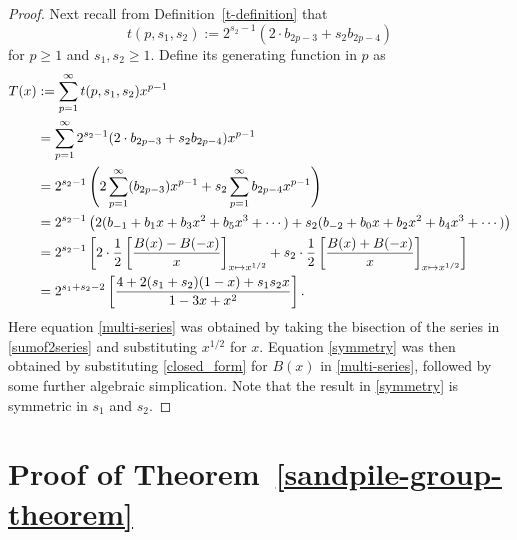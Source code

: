 \documentclass[10pt,reqno]{amsart}
\begin{document}
\begin{proof}
Next recall from Definition~\ref{t-definition} that  
\begin{equation*}
t(p,s_1,s_2):=2^{s_2-1}(2\cdot b_{2p-3} +s_2b_{2p-4})
\end{equation*} for $p \geq 1$ and $s_1,s_2\geq 1$. Define its generating function in $p$ as
\begin{align}
    T(x) &:= \displaystyle\sum_{p=1}^\infty t(p,s_1,s_2)x^{p-1}\notag\\
      &=\displaystyle\sum_{p=1}^\infty 2^{s_2-1}(2\cdot b_{2p-3} +s_2b_{2p-4})x^{p-1}\notag\\
       &=2^{s_2-1}\left(2\displaystyle\sum_{p=1}^\infty  (b_{2p-3} )x^{p-1} + s_2\displaystyle\sum_{p=1}^\infty b_{2p-4}x^{p-1}\right)\notag\\
       &=2^{s_2-1}\left(2(b_{-1} + b_1x + b_3x^2 +b_5x^3+\cdots) + s_2(b_{-2} + b_0x + b_2x^2 +b_4x^3+\cdots)\right)\label{sumof2series}\\
       &= 2^{s_2-1}\left[2\cdot\displaystyle\frac{1}{2}\left[\displaystyle\frac{B(x)-B(-x)}{x} \right]_{x \mapsto x^{1/2}} + s_2\cdot\displaystyle\frac{1}{2}
       \left[\displaystyle\frac{B(x)+B(-x)}{x}\right]_{x \mapsto x^{1/2}} \right] \label{multi-series} \\
       &= 2^{s_1+s_2-2}\left[\displaystyle\frac{4+2(s_1+s_2)(1-x)+s_1s_2x}{1-3x+x^2}\right].
       \label{symmetry}
\end{align}
Here equation \eqref{multi-series} was obtained  by taking the bisection of the series in \eqref{sumof2series} and substituting $x^{1/2}$ for $x.$ Equation \eqref{symmetry} was then obtained by substituting \eqref{closed_form} for $B(x)$ in \eqref{multi-series}, followed by  some further algebraic simplication.  Note that the result in \eqref{symmetry} is symmetric in $s_1$ and $s_2.$
\end{proof}





\section{Proof of Theorem~\ref{sandpile-group-theorem}}\label{group structure}
\end{document}
